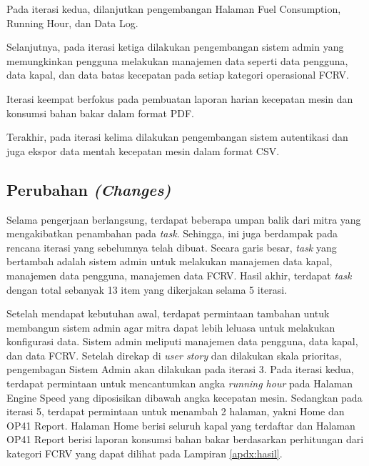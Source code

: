 

Pada iterasi kedua, dilanjutkan pengembangan Halaman Fuel Consumption, Running Hour, dan Data Log.



Selanjutnya, pada iterasi ketiga dilakukan pengembangan sistem admin yang memungkinkan pengguna melakukan manajemen data seperti data pengguna, data kapal, dan data batas kecepatan pada setiap kategori operasional FCRV.



Iterasi keempat berfokus pada pembuatan laporan harian kecepatan mesin dan konsumsi bahan bakar dalam format PDF.



Terakhir, pada iterasi kelima dilakukan pengembangan sistem autentikasi dan juga ekspor data mentah kecepatan mesin dalam format CSV.



\subsection{Perubahan \textit{(Changes)}}

Selama pengerjaan berlangsung, terdapat beberapa umpan balik dari mitra yang mengakibatkan penambahan pada \textit{task}. Sehingga, ini juga berdampak pada rencana iterasi yang sebelumnya telah dibuat. Secara garis besar, \textit{task} yang bertambah adalah sistem admin untuk melakukan manajemen data kapal, manajemen data pengguna, manajemen data FCRV. Hasil akhir, terdapat \textit{task} dengan total sebanyak 13 item yang dikerjakan selama 5 iterasi.



Setelah mendapat kebutuhan awal, terdapat permintaan tambahan untuk membangun sistem admin agar mitra dapat lebih leluasa untuk melakukan konfigurasi data. Sistem admin meliputi manajemen data pengguna, data kapal, dan data FCRV. Setelah direkap di \textit{user story} dan dilakukan skala prioritas, pengembagan Sistem Admin akan dilakukan pada iterasi 3.
Pada iterasi kedua, terdapat permintaan untuk mencantumkan angka \textit{running hour} pada Halaman Engine Speed yang diposisikan dibawah angka kecepatan mesin. Sedangkan pada iterasi 5, terdapat permintaan untuk menambah 2 halaman, yakni Home dan OP41 Report. Halaman Home berisi seluruh kapal yang terdaftar dan Halaman OP41 Report berisi laporan konsumsi bahan bakar berdasarkan perhitungan dari kategori FCRV yang dapat dilihat pada Lampiran \ref{apdx:hasil}.


